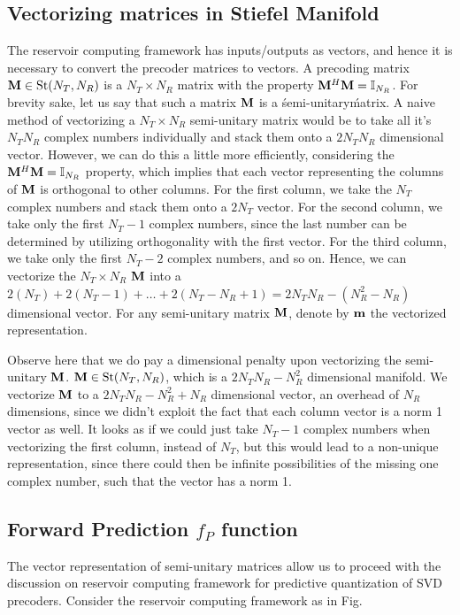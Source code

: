 \documentclass[conference]{IEEEtran}
\begin{document}
\subsection{Vectorizing matrices in Stiefel Manifold}
The reservoir computing framework has inputs/outputs as vectors, and hence it is necessary to convert the precoder matrices to vectors. 
A precoding matrix $\mathcal{{\bf M}} \in \text{St}(N_T,N_R)$ is a $N_T\times N_R$ matrix with the property $\mathcal{{\bf M}}^H\mathcal{{\bf M}}=\mathbb{I}_{N_R}$. 
For brevity sake, let us say that such a matrix $\mathcal{{\bf M}}$ is a \'semi-unitary\' matrix.
A naive method of vectorizing a $N_T\times N_R$ semi-unitary matrix would be to take all it's $N_TN_R$ complex numbers individually and stack them onto a $2N_TN_R$ dimensional vector.
However, we can do this a little more efficiently, considering the $\mathcal{{\bf M}}^H\mathcal{{\bf M}}=\mathbb{I}_{N_R}$ property, which implies that each vector representing the columns of $\mathcal{{\bf M}}$ is orthogonal to other columns.
For the first column, we take the $N_T$ complex numbers and stack them onto a $2N_T$ vector. 
For the second column, we take only the first $N_T-1$ complex numbers, since the last number can be determined by utilizing orthogonality with the first vector. 
For the third column, we take only the first $N_T-2$ complex numbers, and so on. 
Hence, we can vectorize the $N_T\times N_R$ $\mathcal{{\bf M}}$ into a $2(N_T)+2(N_T-1)+\ldots+2(N_T-N_R+1)= 2N_TN_R-(N_R^2-N_R)$ dimensional vector. 
For any semi-unitary matrix $\mathcal{{\bf M}}$, denote by $\mathcal{{\bf m}}$ the vectorized representation.

Observe here that we do pay a dimensional penalty upon vectorizing the semi-unitary $\mathcal{{\bf M}}$. 
$\mathcal{{\bf M}} \in \text{St}(N_T,N_R)$, which is a $2N_TN_R-N_R^2$ dimensional manifold. 
We vectorize $\mathcal{{\bf M}}$ to a $2N_TN_R-N_R^2+N_R$ dimensional vector, an overhead of $N_R$ dimensions, since we didn't exploit the fact that each column vector is a norm 1 vector as well.
It looks as if we could just take $N_T-1$ complex numbers when vectorizing the first column, instead of $N_T$, but this would lead to a non-unique representation, since there could then be infinite possibilities of the missing one complex number, such that the vector has a norm 1.
\subsection{Forward Prediction $f_P$ function}
The vector representation of semi-unitary matrices allow us to proceed with the discussion on reservoir computing framework for predictive quantization of SVD precoders. Consider the reservoir computing framework as in Fig. %
\end{document}
